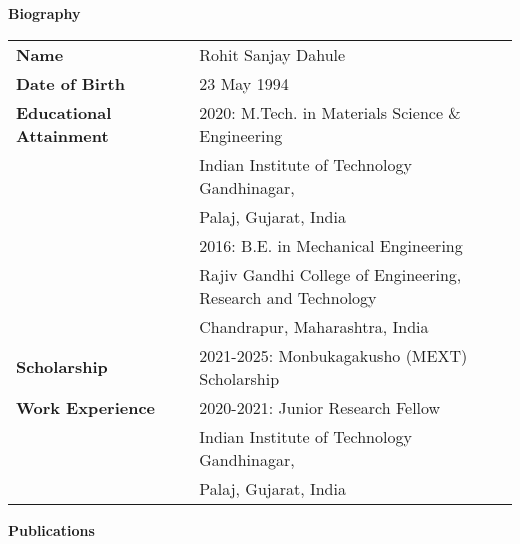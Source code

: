 \begin{center}
{\LARGE\bf Biography}
\end{center}
\vspace{20pt}

\begin{table}[h]
\setlength{\tabcolsep}{0.7ex}
\begin{tabular}{lll}
\textbf{Name} && Rohit Sanjay Dahule \\[3ex]
\textbf{Date of Birth} && 23 May 1994 \\[3ex]
\textbf{Educational Attainment} && 2020: M.Tech. in Materials Science \& Engineering \\[0.5ex] 
    && Indian Institute of Technology Gandhinagar, \\[0.5ex]
    && Palaj, Gujarat, India \\[2ex]
    && 2016: B.E. in Mechanical Engineering\\[0.5ex] 
    && Rajiv Gandhi College of Engineering, Research and Technology \\[0.5ex]
    && Chandrapur, Maharashtra, India \\[2ex]

\textbf{Scholarship} && 2021-2025: Monbukagakusho (MEXT) Scholarship \\[2ex]
\textbf{Work Experience} && 2020-2021: Junior Research Fellow \\[0.5ex]
    && Indian Institute of Technology Gandhinagar, \\[0.5ex] 
    && Palaj, Gujarat, India \\[2ex]
\end{tabular}
\end{table}
\vspace{-10pt} 
\noindent
\textbf{Publications}
